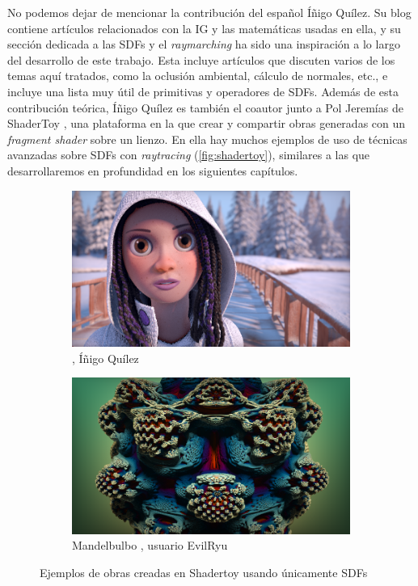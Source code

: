No podemos dejar de mencionar la contribución del español Íñigo Quílez. Su blog \cite{Quilez_undated-oh} contiene artículos relacionados con la IG y las matemáticas usadas en ella, y su sección dedicada a las SDFs y el \textit{raymarching} ha sido una inspiración a lo largo del desarrollo de este trabajo. Esta incluye artículos que discuten varios de los temas aquí tratados, como la oclusión ambiental, cálculo de normales, etc., e incluye una lista muy útil de primitivas y operadores de SDFs. Además de esta contribución teórica, Íñigo Quílez es también el coautor junto a Pol Jeremías de ShaderToy \cite{shadertoy}, una plataforma en la que crear y compartir obras generadas con un \textit{fragment shader} sobre un lienzo. En ella hay muchos ejemplos de uso de técnicas avanzadas sobre SDFs con \textit{raytracing} (\autoref{fig:shadertoy}), similares a las que desarrollaremos en profundidad en los siguientes capítulos.
\begin{figure}[!h]
    \centering
    \begin{subfigure}[b]{0.45\textwidth}
        \centering
        \includegraphics[width=\textwidth]{Plantilla-TFG-master/img/shadertoy1.png}
        \caption{ \cite{shader2}, Íñigo Quílez}
    \end{subfigure}
    \hspace{15pt}
    \begin{subfigure}[b]{0.45\textwidth}
        \centering
        \includegraphics[width=\textwidth]{Plantilla-TFG-master/img/shadertoy2.png}
        \caption{Mandelbulbo \cite{shader1}, usuario EvilRyu}
    \end{subfigure}
    \hfill
     \caption{Ejemplos de obras creadas en Shadertoy usando únicamente SDFs}
     \label{fig:shadertoy}
\end{figure}

